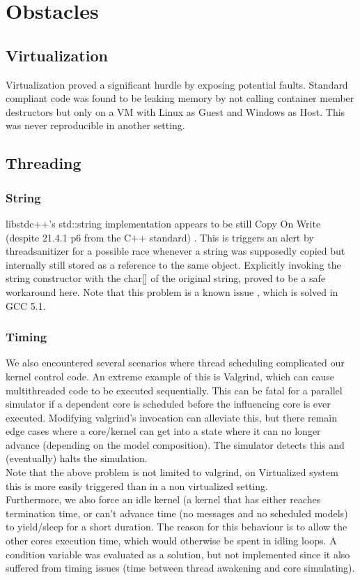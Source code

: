 \documentclass[8pt,a4paper]{report}
\begin{document}
\chapter{Obstacles}
\section{Virtualization}
Virtualization proved a significant hurdle by exposing potential faults. Standard compliant code was found to be leaking memory by not calling container member destructors but only on a VM with Linux as Guest and Windows as Host. This was never reproducible in another setting.
\section{Threading}
\subsection{String}
libstdc++'s std::string implementation appears to be still Copy On Write (despite 21.4.1 p6 from the C++ standard) \cite{cpp}. This is triggers an alert by threadsanitizer for a possible race whenever a string was supposedly copied but internally still stored as a reference to the same object. Explicitly invoking the string constructor with the char[] of the original string, proved to be a safe workaround here. Note that this problem is a known issue \cite{cow}, which is solved in GCC 5.1.\\
\subsection{Timing}
We also encountered several scenarios where thread scheduling complicated our kernel control code. An extreme example of this is Valgrind, which can cause multithreaded code to be executed sequentially. This can be fatal for a parallel simulator if a dependent core is scheduled before the influencing core is ever executed. Modifying valgrind's invocation can alleviate this, but there remain edge cases where a core/kernel can get into a state where it can no longer advance (depending on the model composition). The simulator detects this and (eventually) halts the simulation. \\ Note that the above problem is not limited to valgrind, on Virtualized system this is more easily triggered than in a non virtualized setting.\\
Furthermore, we also force an idle kernel (a kernel that has either reaches termination time, or can't advance time (no messages and no scheduled models) to yield/sleep for a short duration. The reason for this behaviour is to allow the other cores execution time, which would otherwise be spent in idling loops. A condition variable was evaluated as a solution, but not implemented since it also suffered from timing issues (time between thread awakening and core simulating).
\end{document}
